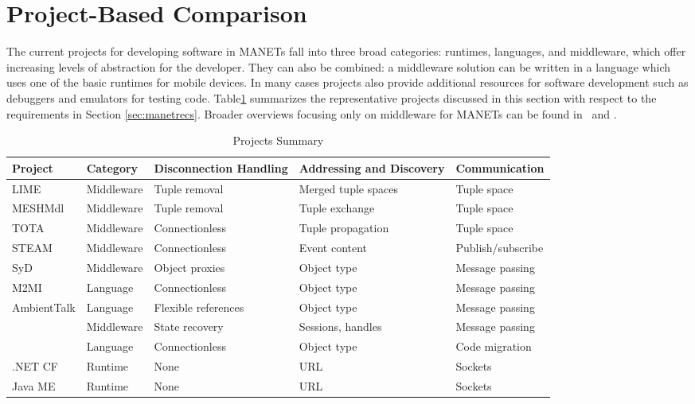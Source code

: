 \section{Project-Based Comparison}\label{sec:proj_eval}

The current projects for developing software in MANETs fall into three broad categories: runtimes, languages, and middleware, which offer increasing levels of abstraction for the developer. They can also be combined: a middleware solution can be written in a language which uses one of the basic runtimes for mobile devices. In many cases projects also provide additional resources for software development such as debuggers and emulators for testing code. Table\ref{table:projs} summarizes the representative projects discussed in this section with respect to the requirements in Section \ref{sec:manetrecs}. Broader overviews focusing only on middleware for MANETs can be found in~\cite{middlewaresurvey} and \cite{newmiddlewaresurvey}.

\begin{table}\footnotesize
\centering
\caption{Projects Summary}
\begin{tabular}{|p{2.2cm}|p{2cm}|p{2.75cm}|p{2.7cm}|p{2.7cm}|} \hline
\textbf{Project} & \textbf{Category} & \textbf{Disconnection Handling} & \textbf{Addressing and Discovery} & \textbf{Communication} \\ \hline
LIME & Middleware & Tuple removal & Merged tuple spaces & Tuple space \\ \hline
MESHMdl & Middleware & Tuple removal & Tuple exchange & Tuple space \\ \hline
TOTA & Middleware & Connectionless & Tuple propagation & Tuple space \\ \hline
STEAM & Middleware  & Connectionless & Event content & Publish/subscribe \\ \hline
SyD & Middleware &  Object proxies &  Object type & Message passing \\ \hline
M2MI & Language & Connectionless &  Object type & Message passing \\ \hline
AmbientTalk & Language &  Flexible references &  Object type & Message passing \\ \hline

SpatialViews & Language & Connectionless & Object type & Code migration \\ \hline
.NET CF & Runtime &  None & URL & Sockets \\ \hline
Java ME & Runtime & None & URL & Sockets \\ \hline
\end{tabular}
\label{table:projs}
\end{table}

